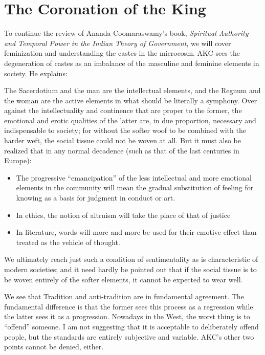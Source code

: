 \section{The Coronation of the King}

To continue the review of Ananda Coomaraswamy's book, \emph{Spiritual Authority and Temporal Power in the Indian Theory of Government}, we will cover feminization and understanding the castes in the microcosm. AKC sees the degeneration of castes as an imbalance of the masculine and feminine elements in society. He explains:

\begin{quotex}
The Sacerdotium and the man are the intellectual elements, and the Regnum and the woman are the active elements in what should be literally a symphony. Over against the intellectuality and continence that are proper to the former, the emotional and erotic qualities of the latter are, in due proportion, necessary and indispensable to society; for without the softer woof to be combined with the harder weft, the social tissue could not be woven at all. But it must also be realized that in any normal decadence (such as that of the last centuries in Europe):

\begin{itemize}


\item The progressive ``emancipation'' of the less intellectual and more emotional elements in the community will mean the gradual substitution of feeling for knowing as a basis for judgment in conduct or art.

\item In ethics, the notion of altruism will take the place of that of justice

\item In literature, words will more and more be used for their emotive effect than treated as the vehicle of thought.
\end{itemize}
\end{quotex}


We ultimately reach just such a condition of sentimentality as is characteristic of modern societies; and it need hardly be pointed out that if the social tissue is to be woven entirely of the softer elements, it cannot be expected to wear well.

We see that Tradition and anti-tradition are in fundamental agreement. The fundamental difference is that the former sees this process as a regression while the latter sees it as a progression. Nowadays in the West, the worst thing is to ``offend'' someone. I am not suggesting that it is acceptable to deliberately offend people, but the standards are entirely subjective and variable. AKC's other two points cannot be denied, either.

